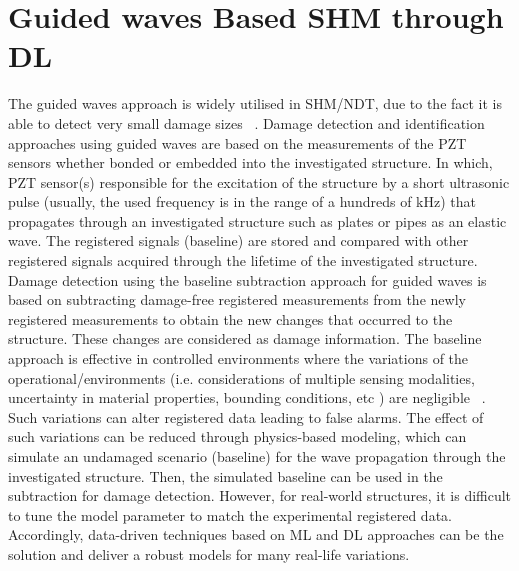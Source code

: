 \section{Guided waves Based SHM through DL}
The guided waves approach is widely utilised in SHM/NDT, due to the fact it is able to detect very small damage sizes ~\cite{Guemes2020}. 
Damage detection and identification approaches using guided waves are based on the measurements of the PZT sensors whether bonded or embedded into the investigated structure. 
In which, PZT sensor(s) responsible for the excitation of the structure by a short ultrasonic pulse (usually, the used frequency is in the range of a hundreds of kHz) that propagates through an investigated structure such as plates or pipes as an elastic wave.
The registered signals (baseline) are stored and compared with other registered signals acquired through the lifetime of the investigated structure.
Damage detection using the baseline subtraction approach for guided waves is based on subtracting damage-free registered measurements from the newly registered measurements to obtain the new changes that occurred to the structure.
These changes are considered as damage information.
The baseline approach is effective in controlled environments where the variations of the operational/environments (i.e. considerations of multiple sensing modalities, uncertainty in material properties, bounding conditions, etc ) are negligible ~\cite{Yuan2020}.  
Such variations can alter registered data leading to false alarms.
The effect of such variations can be reduced through physics-based modeling, which can simulate an undamaged scenario (baseline) for the wave propagation through the investigated structure.
Then, the simulated baseline can be used in the subtraction for damage detection.
However, for real-world structures, it is difficult to tune the model parameter to match the experimental registered data.
Accordingly, data-driven techniques based on ML and DL approaches can be the solution and deliver a robust models for many real-life variations.

